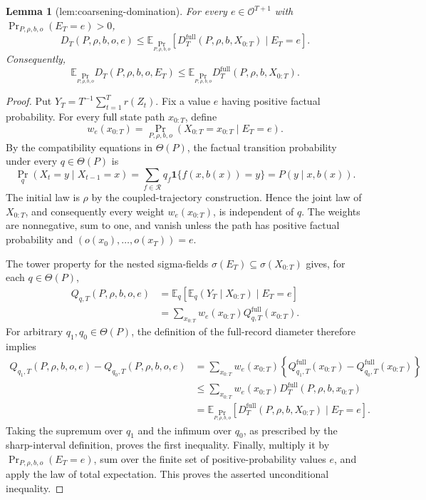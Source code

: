 \documentclass{article}
\newtheorem{lemma}{Lemma}
\begin{document}
\begin{lemma}[lem:coarsening-domination]\label{lem:coarsening-domination}
For every \(e\in\mathcal O^{T+1}\) with \(\Pr_{P,\rho,b,o}(E_T=e)>0\), \[D_T(P,\rho,b,o,e)\le\mathbb E_{\Pr_{P,\rho,b,o}}\!\left[D^{\mathrm{full}}_T(P,\rho,b,X_{0:T})\mid E_T=e\right].\] Consequently, \[\mathbb E_{\Pr_{P,\rho,b,o}}D_T(P,\rho,b,o,E_T)\le\mathbb E_{\Pr_{P,\rho,b,o}}D^{\mathrm{full}}_T(P,\rho,b,X_{0:T}).\]
\end{lemma}
\begin{proof}
Put \(Y_T=T^{-1}\sum_{t=1}^T r(Z_t)\).  Fix a value \(e\) having positive factual probability.  For every full state path \(x_{0:T}\), define
\[
 w_e(x_{0:T})=
 \Pr_{P,\rho,b,o}(X_{0:T}=x_{0:T}\mid E_T=e).
\]
By the compatibility equations in \(\Theta(P)\), the factual transition probability under every \(q\in\Theta(P)\) is
\[
 \Pr_q(X_t=y\mid X_{t-1}=x)
 =\sum_{f\in\mathcal R}q_f\mathbf 1\{f(x,b(x))=y\}
 =P(y\mid x,b(x)).
\]
The initial law is \(\rho\) by the coupled-trajectory construction.  Hence the joint law of \(X_{0:T}\), and consequently every weight \(w_e(x_{0:T})\), is independent of \(q\).  The weights are nonnegative, sum to one, and vanish unless the path has positive factual probability and \((o(x_0),\ldots,o(x_T))=e\).

The tower property for the nested sigma-fields \(\sigma(E_T)\subseteq\sigma(X_{0:T})\) gives, for each \(q\in\Theta(P)\),
\[
\begin{aligned}
 Q_{q,T}(P,\rho,b,o,e)
 &=\mathbb E_q\!\left[\mathbb E_q(Y_T\mid X_{0:T})\mid E_T=e\right]\\
 &=\sum_{x_{0:T}}w_e(x_{0:T})Q^{\mathrm{full}}_{q,T}(x_{0:T}).
\end{aligned}
\]
For arbitrary \(q_1,q_0\in\Theta(P)\), the definition of the full-record diameter therefore implies
\[
\begin{aligned}
 Q_{q_1,T}(P,\rho,b,o,e)-Q_{q_0,T}(P,\rho,b,o,e)
 &=\sum_{x_{0:T}}w_e(x_{0:T})
 \left\{Q^{\mathrm{full}}_{q_1,T}(x_{0:T})
       -Q^{\mathrm{full}}_{q_0,T}(x_{0:T})\right\}\\
 &\le \sum_{x_{0:T}}w_e(x_{0:T})
 D^{\mathrm{full}}_T(P,\rho,b,x_{0:T})\\
 &=\mathbb E_{\Pr_{P,\rho,b,o}}\!\left[
 D^{\mathrm{full}}_T(P,\rho,b,X_{0:T})\mid E_T=e\right].
\end{aligned}
\]
Taking the supremum over \(q_1\) and the infimum over \(q_0\), as prescribed by the sharp-interval definition, proves the first inequality.  Finally, multiply it by \(\Pr_{P,\rho,b,o}(E_T=e)\), sum over the finite set of positive-probability values \(e\), and apply the law of total expectation.  This proves the asserted unconditional inequality.
\end{proof}
\end{document}
